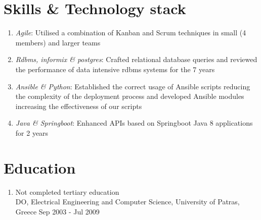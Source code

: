 \documentclass{CVSoftwareEngineer}
\begin{document}
	\section{Skills \& Technology stack}
	\begin{enumerate}[labelwidth=!, labelindent=22pt, leftmargin=*, rightmargin=15pt]
		\item[\textasteriskcentered] \textit{Agile}: Utilised a combination of Kanban and Scrum techniques in small (4 members)
			and larger teams
		\item[\textasteriskcentered] \textit{Rdbms, informix \& postgres}: Crafted relational database queries and reviewed
			the performance of data intensive rdbms systems for the 7 years
		\item[\textasteriskcentered] \textit{Ansible \& Python}: Established the correct usage of Ansible scripts reducing the complexity
			of the deployment process and developed Ansible modules increasing the effectiveness of our scripts
		\item[\textasteriskcentered] \textit{Java \& Springboot}: Enhanced APIs based on Springboot Java 8 applications for 2 years
	\end{enumerate}

	\section{Education}
	\begin{enumerate}[labelwidth=!, labelindent=0pt, leftmargin=*, rightmargin=15pt]
		\item[] Not completed tertiary education \\
			DO, Electrical Engineering and Computer Science, University of Patras, Greece \hfill {\scriptsize Sep 2003 - Jul 2009}
	\end{enumerate}
\end{document}
